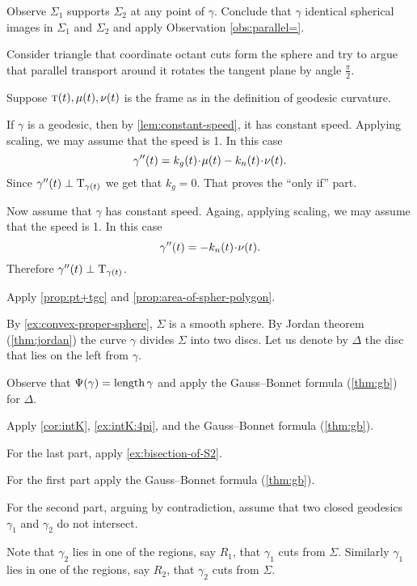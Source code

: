 Observe $\Sigma_1$ supports $\Sigma_2$ at any point of $\gamma$.
Conclude that $\gamma$ identical spherical images in $\Sigma_1$ and $\Sigma_2$ and apply Observation \ref{obs:parallel=}.

Consider triangle that coordinate octant cuts form the sphere and try to argue that parallel transport around it rotates the tangent plane by angle $\tfrac\pi 2$. 

Suppose $\textsc{t}(t),\mu(t),\nu(t)$ is the frame as in the definition of geodesic curvature.

If $\gamma$ is a geodesic, then by \ref{lem:constant-speed}, it has constant speed.
Applying scaling, we may assume that the speed is 1.
In this case 
\[\gamma''(t)=k_g(t)\cdot \mu(t)-k_n(t)\cdot \Norm(t).\]
Since $\gamma''(t)\perp\mathrm{T}_{\gamma(t)}$ we get that $k_g=0$. 
That proves the ``only if'' part.

Now assume that $\gamma$ has constant speed.
Againg, applying scaling, we may assume that the speed is 1.
In this case 
\[\gamma''(t)=-k_n(t)\cdot \Norm(t).\]
Therefore $\gamma''(t)\perp\mathrm{T}_{\gamma(t)}$.

Apply \ref{prop:pt+tgc} and \ref{prop:area-of-spher-polygon}.

By \ref{ex:convex-proper-sphere}, $\Sigma$ is a smooth sphere.
By Jordan theorem (\ref{thm:jordan}) the curve $\gamma$ divides $\Sigma$  into two discs.
Let us denote by $\Delta$ the disc that lies on the left from $\gamma$.

Observe that $\Psi({\gamma})=\mathop{\rm length}\nolimits\gamma$ and apply  the Gauss--Bonnet formula (\ref{thm:gb}) for $\Delta$.

Apply \ref{cor:intK}, \ref{ex:intK:4pi}, and the Gauss--Bonnet formula (\ref{thm:gb}).

For the last part, apply \ref{ex:bisection-of-S2}.

 For the first part apply the Gauss--Bonnet formula (\ref{thm:gb}).

For the second part, arguing by contradiction, assume that two closed geodesics $\gamma_1$ and $\gamma_2$ do not intersect.

Note that $\gamma_2$ lies in one of the regions, say $R_1$, that $\gamma_1$ cuts  from $\Sigma$.
Similarly $\gamma_1$ lies in one of the regions, say $R_2$, that $\gamma_2$ cuts  from $\Sigma$.

